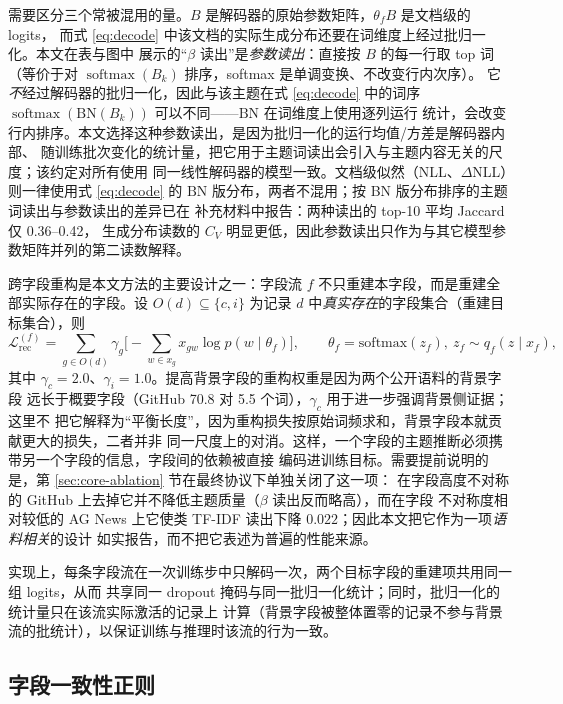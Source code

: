 \documentclass[11pt]{ctexart}
\begin{document}
需要区分三个常被混用的量。$B$ 是解码器的原始参数矩阵，$\theta_f B$ 是文档级的 logits，
而式 \eqref{eq:decode} 中该文档的实际生成分布还要在词维度上经过批归一化。本文在表与图中
展示的“$\beta$ 读出”是\emph{参数读出}：直接按 $B$ 的每一行取 top 词（等价于对
$\operatorname{softmax}(B_k)$ 排序，softmax 是单调变换、不改变行内次序）。
它\emph{不}经过解码器的批归一化，因此与该主题在式 \eqref{eq:decode} 中的词序
$\operatorname{softmax}(\mathrm{BN}(B_k))$ 可以不同——$\mathrm{BN}$ 在词维度上使用逐列运行
统计，会改变行内排序。本文选择这种参数读出，是因为批归一化的运行均值/方差是解码器内部、
随训练批次变化的统计量，把它用于主题词读出会引入与主题内容无关的尺度；该约定对所有使用
同一线性解码器的模型一致。文档级似然（NLL、$\Delta$NLL）则一律使用式 \eqref{eq:decode} 的
$\mathrm{BN}$ 版分布，两者不混用；按 BN 版分布排序的主题词读出与参数读出的差异已在
补充材料中报告：两种读出的 top-10 平均 Jaccard 仅 0.36--0.42，
生成分布读数的 $C_V$ 明显更低，因此参数读出只作为与其它模型参数矩阵并列的第二读数解释。

跨字段重构是本文方法的主要设计之一：字段流 $f$ 不只重建本字段，而是重建全部实际存在的字段。设
$O(d)\subseteq\{c,i\}$ 为记录 $d$ 中\emph{真实存在}的字段集合（重建目标集合），则
\begin{equation}
\mathcal{L}_{\mathrm{rec}}^{(f)}
=\sum_{g\in O(d)}\gamma_g\Big[-\sum_{w\in x_g}x_{gw}\log p(w\mid\theta_f)\Big],
\qquad \theta_f=\mathrm{softmax}(z_f),\ z_f\sim q_f(z\mid x_f),
\label{eq:lrec}
\end{equation}
其中 $\gamma_c=2.0$、$\gamma_i=1.0$。提高背景字段的重构权重是因为两个公开语料的背景字段
远长于概要字段（GitHub 70.8 对 5.5 个词），$\gamma_c$ 用于进一步强调背景侧证据；这里不
把它解释为“平衡长度”，因为重构损失按原始词频求和，背景字段本就贡献更大的损失，二者并非
同一尺度上的对消。这样，一个字段的主题推断必须携带另一个字段的信息，字段间的依赖被直接
编码进训练目标。需要提前说明的是，第 \ref{sec:core-ablation} 节在最终协议下单独关闭了这一项：
在字段高度不对称的 GitHub 上去掉它并不降低主题质量（$\beta$ 读出反而略高），而在字段
不对称度相对较低的 AG News 上它使类 TF-IDF 读出下降 $0.022$；因此本文把它作为一项\emph{语料相关}的设计
如实报告，而不把它表述为普遍的性能来源。

实现上，每条字段流在一次训练步中只解码一次，两个目标字段的重建项共用同一组 logits，从而
共享同一 dropout 掩码与同一批归一化统计；同时，批归一化的统计量只在该流实际激活的记录上
计算（背景字段被整体置零的记录不参与背景流的批统计），以保证训练与推理时该流的行为一致。

\subsection{字段一致性正则}
\end{document}
